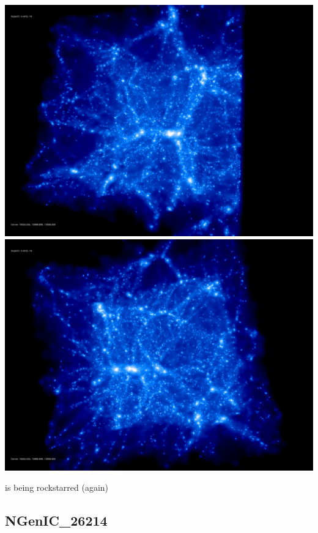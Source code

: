 \includegraphics[scale=0.1]{NGenIC_15039/rotate_00074.jpg} 
\includegraphics[scale=0.1]{NGenIC_15039/rotate_00131.jpg}

is being rockstarred  (again) \\


% 
%
%
%
%
%
%
%


\newpage
\subsection{NGenIC\_26214}

